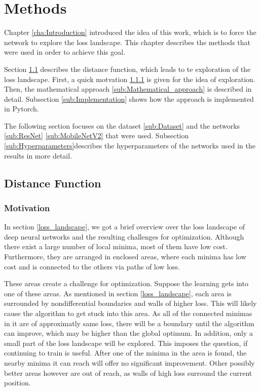 \chapter{Methods}\label{cha:Methods}

Chapter \ref{cha:Introduction} introduced the idea of this work, which is to
force the network to explore the loss landscape. This chapter describes the
methods that were used in order to achieve this goal. 

Section \ref{seq:Distance} describes the distance function, which leads to te
exploration of the loss landscape. First, a quick motvation \ref{sub:Motivation}
is given for the idea of exploration. Then, the mathematical approach
\ref{sub:Mathematical_approach} is described in detail. Subsection
\ref{sub:Implementation} shows how the approach is implemented in Pytorch.

The following section focuses on the dataset \ref{sub:Dataset} and the networks
\ref{sub:ResNet} \ref{sub:MobileNetV2} that were used. Subsection
\ref{sub:Hyperparameters}describes the hyperparameters of the networks used in
the results in more detail.


\section{Distance Function}\label{seq:Distance}
\subsection{Motivation}\label{sub:Motivation} In section \ref{loss_landscape},
we got a brief overview over the loss landscape of deep neural networks and the
resulting challenges for optimization. Although there exist a large number of
local minima, most of them have low cost. Furthermore, they are arranged in
enclosed areas, where each minima has low cost and is connected to the others
via paths of low loss.

These areas create a challenge for optimization. Suppose the learning gets into
one of these areas. As mentioned in section \ref{loss_landscape}, each area is
surrounded by nondifferential boundaries and walls of higher loss. This will
likely cause the algorithm to get stuck into this area. As all of the connected
minimas in it are of approximatly same loss, there will be a boundary until the
algorithm can improve, which may be higher than the global optimum. In addition,
only a small part of the loss landscape will be explored. This imposes the
question, if continuing to train is useful. After one of the minima in the area
is found, the nearby minima it can reach will offer no significant improvement.
Other possibly better areas however are out of reach, as walls of high loss
surround the current position.

